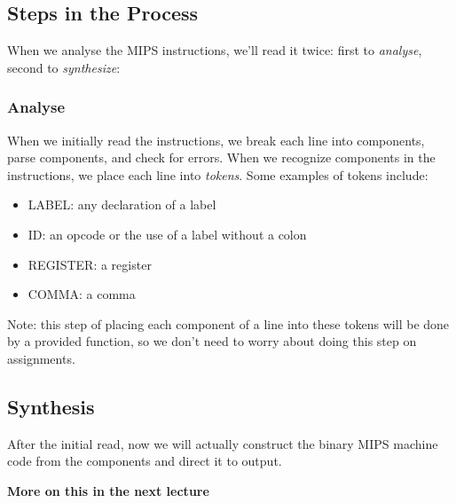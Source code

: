 \documentclass{report}
\begin{document}
\subsection{Steps in the Process}
When we analyse the MIPS instructions, we'll read it twice: first to \textit{analyse}, second to \textit{synthesize}:
\subsubsection{Analyse}
When we initially read the instructions, we break each line into components, parse components, and check for errors. When we recognize components in the instructions, we place each line into \textit{tokens}. Some examples of tokens include:
\begin{itemize}
\item LABEL: any declaration of a label
\item ID: an opcode or the use of a label without a colon
\item REGISTER: a register
\item COMMA: a comma
\end{itemize}
Note: this step of placing each component of a line into these tokens will be done by a provided function, so we don't need to worry about doing this step on assignments.
\subsection{Synthesis}
After the initial read, now we will actually construct the binary MIPS machine code from the components and direct it to output.
\begin{center}
\textbf{More on this in the next lecture}
\end{center}
\end{document}
